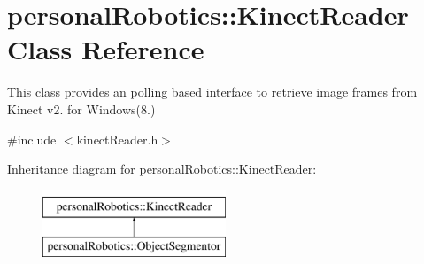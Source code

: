 \hypertarget{classpersonal_robotics_1_1_kinect_reader}{}\section{personal\+Robotics\+:\+:Kinect\+Reader Class Reference}
\label{classpersonal_robotics_1_1_kinect_reader}


This class provides an polling based interface to retrieve image frames from Kinect v2. for Windows(8.)  




{\ttfamily \#include $<$kinect\+Reader.\+h$>$}

Inheritance diagram for personal\+Robotics\+:\+:Kinect\+Reader\+:\begin{figure}[H]
\begin{center}
\leavevmode
\includegraphics[height=2.000000cm]{d2/d0e/classpersonal_robotics_1_1_kinect_reader}
\end{center}
\end{figure}
